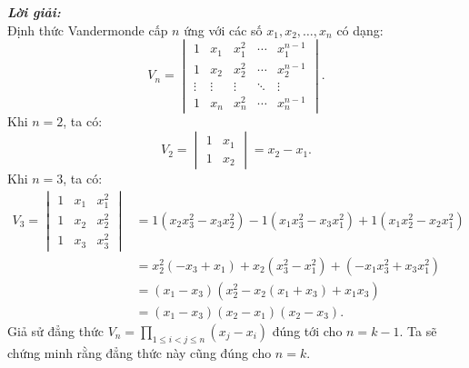 \documentclass[12pt,a4paper,oneside]{book}
\newenvironment{loigiai}{%
    \par\noindent\textbf{\textit{\color{mainblue}Lời giải:}}\ \ignorespaces \\ 
}{%
    
}
\begin{document}
\begin{loigiai}
Định thức Vandermonde cấp $n$ ứng với các số $x_1, x_2, \dots, x_n$ có dạng:
\[
    V_n = \begin{vmatrix}
        1 & x_1 & x_1^2 & \cdots & x_1^{n-1} \\
        1 & x_2 & x_2^2 & \cdots & x_2^{n-1} \\
        \vdots & \vdots & \vdots & \ddots & \vdots \\
        1 & x_n & x_n^2 & \cdots & x_n^{n-1}
    \end{vmatrix}.
\]
Khi $n=2$, ta có:
\[
V_2 = \begin{vmatrix}
    1 & x_1 \\
    1 & x_2
\end{vmatrix} = x_2 - x_1.
\]
Khi $n=3$, ta có:
\[
\begin{aligned}
        V_3 = \begin{vmatrix}
        1 & x_1 & x_1^2 \\
        1 & x_2 & x_2^2 \\
        1 & x_3 & x_3^2
    \end{vmatrix} &= 1 (x_2 x_3^2 - x_3 x_2^2) - 1 (x_1 x_3^2 - x_3 x_1^2) + 1 (x_1 x_2^2 - x_2 x_1^2) \\
    &= x_2^2(-x_3+x_1) + x_2(x_3^2-x_1^2)  +(-x_1 x_3^2 + x_3 x_1^2) \\
    &= (x_1-x_3)(x_2^2-x_2(x_1+x_3) + x_1 x_3) \\
    &= (x_1-x_3)(x_2-x_1)(x_2-x_3).
\end{aligned}
\]
Giả sử đẳng thức $V_n = \prod_{1 \leq i < j \leq n} (x_j - x_i)$ đúng tới cho $n = k-1$. Ta sẽ chứng minh rằng đẳng thức này cũng đúng cho $n = k$.


\end{loigiai}
\end{document}
